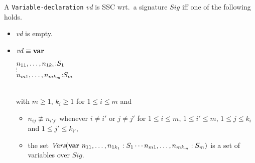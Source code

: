 \documentclass[twoside,fleqn,a4paper,dvips]{article}
\newcommand{\Vars}{\mbox{\em Vars}}
\begin{document}
\begin{defn}
A {\tt Variable-declaration} {\it vd} is SSC wrt.\ a signature
$Sig$ iff one of the following holds.
\begin{itemize}
\item
{\it vd} is empty.
\item
${\it vd}\equiv\mathbf{var}$
\begin{minipage}[t]{7cm}
$n_{11},\ldots,n_{1k_1}{:}  S_1$\\
$\vdots$\\
$n_{m1},\ldots,n_{mk_m}{:}  S_m$\vspace{2ex}
\end{minipage}\\
with $m\geq 1$, $k_i\geq 1$ for $1\leq i\leq m$ and
\begin{itemize}
\item
$n_{ij}\not\equiv n_{i'j'}$ whenever $i\neq i'$ or 
$j\neq j'$ for $1\leq i\leq m$, $1\leq i'\leq m$,
$1\leq j\leq k_i$ and $1\leq j'\leq k_{i'}$,
\item
the set $\Vars(\varkw~n_{11},\ldots,n_{1k_1}: 
S_1\cdots n_{m1},\ldots,n_{mk_m}:
S_m)$ is a set of variables
over $Sig$.
\end{itemize}
\end{itemize}
\end{defn}
\end{document}
